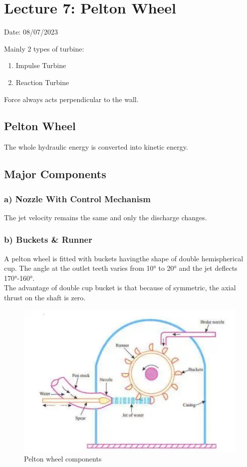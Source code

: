 \documentclass{article}
\begin{document}
\section{Lecture 7: Pelton Wheel}
\hfill Date: 08/07/2023

Mainly 2 types of turbine:
\begin{enumerate}
  \item Impulse Turbine 
  \item Reaction Turbine 
\end{enumerate}

\checkmark  Force always acts perpendicular to the wall. 
\subsection*{Pelton Wheel}
The whole hydraulic energy is converted into kinetic energy. 

\subsection*{Major Components}
\subsubsection*{a) Nozzle With Control Mechanism}
The jet velocity remains the same and only the discharge changes. 
\subsubsection*{b) Buckets \& Runner}
A pelton wheel is fitted with buckets havingthe shape of double hemispherical cup. The angle at the outlet teeth varies from 10° to 20° and the jet deflects 170°-160°.\\

The advantage of double cup bucket is that because of symmetric, the axial thrust on the shaft is zero. 

\begin{figure}[h]
  \begin{center}
    \includegraphics[width=0.8\linewidth]{img/PELTON-TURBINE.png}
    \caption[Pelton wheel components]{Pelton wheel components}
  \end{center}
\end{figure}
\end{document}
